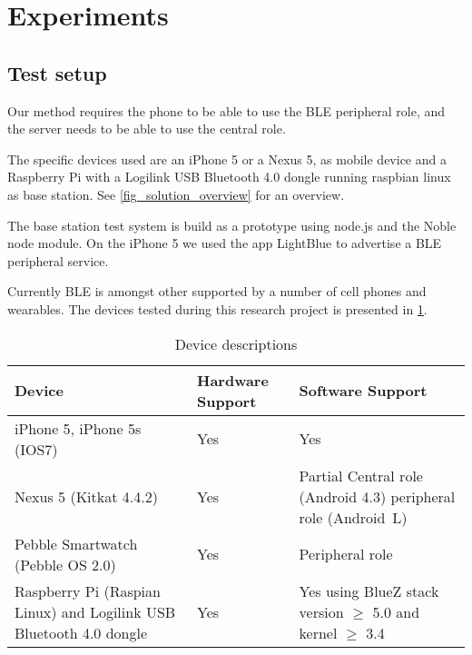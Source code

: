 \section{Experiments}

\subsection{Test setup}

Our method requires the phone to be able to use the BLE peripheral role, and the server needs to be able to use the central role.

The specific devices used are an iPhone 5 or a Nexus 5, as mobile device and a Raspberry Pi with a Logilink USB Bluetooth 4.0 dongle running raspbian linux as base station. See \cref{fig_solution_overview} for an overview.

The base station test system is build as a prototype using node.js and the Noble node module.
On the iPhone 5 we used the app LightBlue to advertise a BLE peripheral service.

Currently BLE is amongst other supported by a number of cell phones and wearables. 
The devices tested during this research project is presented in \cref{table:devices}.

\begin{table}[!t]
\caption{Device descriptions}
\label{table:devices}
\centering
\begin{tabular}{|p{2.3cm}|p{1.3cm}|p{3.9cm}|}
\hline
\textbf{Device} & \textbf{Hardware Support} & \textbf{Software Support}\\
\hline
iPhone 5, iPhone 5s (IOS7) & Yes & Yes\\
\hline
Nexus 5 \newline (Kitkat 4.4.2) & Yes & Partial \newline
Central role (Android 4.3)  \newline
peripheral role (Android~L)\\
\hline
Pebble Smartwatch (Pebble OS 2.0) & Yes & Peripheral role\\
\hline
Raspberry Pi (Raspian Linux) and Logilink USB Bluetooth 4.0 dongle & Yes & Yes using BlueZ stack version $\geq$ 5.0 and kernel $\geq$ 3.4\\
\hline

\end{tabular}
\end{table}


